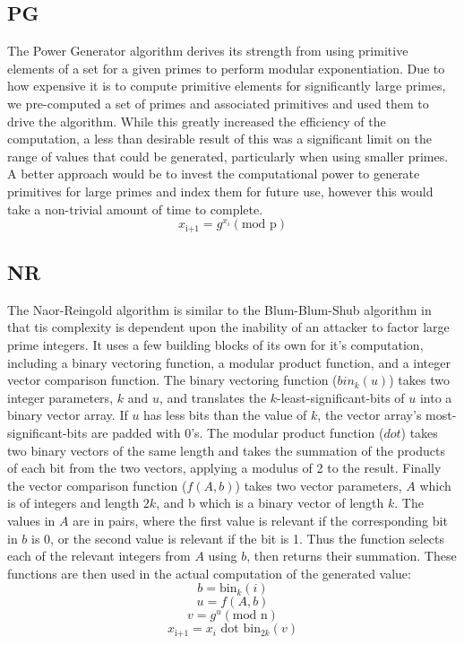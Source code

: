 \documentclass[12pt,letter,notitlepage]{article}
\begin{document}
\subsection{PG}

The Power Generator algorithm derives its strength from using primitive elements of a set for a given primes to perform modular exponentiation. Due to how expensive it is to compute primitive elements for significantly large primes, we pre-computed a set of primes and associated primitives and used them to drive the algorithm. While this greatly increased the efficiency of the computation, a less than desirable result of this was a significant limit on the range of values that could be generated, particularly when using smaller primes. A better approach would be to invest the computational power to generate primitives for large primes and index them for future use, however this would take a non-trivial amount of time to complete.
\[x_{\text{i+1}} = g^{x_i} ({\text{mod p}})\]

\subsection{NR}

The Naor-Reingold algorithm is similar to the Blum-Blum-Shub algorithm in that tis complexity is dependent upon the inability of an attacker to factor large prime integers. It uses a few building blocks of its own for it's computation, including a binary vectoring function, a modular product function, and a integer vector comparison function. The binary vectoring function ($bin_k(u)$) takes two integer parameters, $k$ and $u$, and translates the $k$-least-significant-bits of $u$ into a binary vector array. If $u$ has less bits than the value of $k$, the vector array's most-significant-bits are padded with 0's. The modular product function ($dot$) takes two binary vectors of the same length and takes the summation of the products of each bit from the two vectors, applying a modulus of 2 to the result. Finally the vector comparison function ($f(A,b)$) takes two vector parameters, $A$ which is of integers and length $2k$, and b which is a binary vector of length $k$. The values in $A$ are in pairs, where the first value is relevant if the corresponding bit in $b$ is 0, or the second value is relevant if the bit is 1. Thus the function selects each of the relevant integers from $A$ using $b$, then returns their summation. These functions are then used in the actual computation of the generated value:
\[b = {\text{bin}}_k(i)\]
\[u = f(A,b)\]
\[v = g^u ({\text{mod n}})\]
\[x_{\text{i+1}} = x_i {\text{ dot }} {\text{bin}}_{2k}(v)\]
\end{document}
